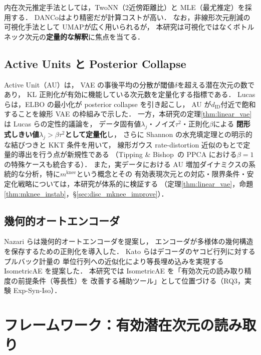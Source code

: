 \documentclass[11pt,a4paper]{jsarticle}
\newcommand{\mknee}{m^{\mathrm{knee}}}
\begin{document}
内在次元推定手法としては，TwoNN\cite{facco2017twonn}（2近傍距離比）と
MLE\cite{levina2005mle}（最尤推定）を採用する．
DANCo\cite{ceruti2014danco}はより精密だが計算コストが高い．
なお，非線形次元削減の可視化手法として UMAP\cite{mcinnes2018umap}が広く用いられるが，
本研究は可視化ではなくボトルネック次元の\textbf{定量的な解釈}に焦点を当てる．

\subsection{Active Units と Posterior Collapse}\label{sec:related_au}

Active Unit（AU）\cite{lucas2019elbo,higgins2017betavae}は，
VAE の事後平均の分散が閾値$\delta$を超える潜在次元の数であり，
KL 正則化が有効に機能している次元数を定量化する指標である．
Lucas ら\cite{lucas2019elbo}は，ELBO の最小化が posterior collapse を引き起こし，
AU が$d_{\mathrm{ID}}$付近で飽和することを線形 VAE の枠組みで示した．
一方，本研究の定理\ref{thm:linear_vae}は Lucas らの定性的議論を，
データ固有値$\lambda_j$・ノイズ$\tau^2$・正則化$\beta$による
\textbf{閉形式しきい値$\lambda_j > \beta\tau^2$として定量化}し，
さらに Shannon の水充填定理との明示的な結びつきと KKT 条件を用いて，
線形ガウス rate-distortion 近似のもとで定量的導出を行う点が新規性である
（Tipping \& Bishop~\cite{tippingbishop1999ppca}の PPCA における$\beta=1$の特殊ケースも統合する）．
また，実データにおける AU 増加ダイナミクスの系統的な分析，特に$\mknee$という概念とその
有効表現次元との対応・限界条件・安定化戦略については，本研究が体系的に検証する
（定理\ref{thm:linear_vae}，命題\ref{thm:mknee_instab}，§\ref{sec:disc_mknee_improve}）．

\subsection{幾何的オートエンコーダ}\label{sec:related_geo}

Nazari ら\cite{nazari2023geometric}は幾何的オートエンコーダを提案し，
エンコーダが多様体の幾何構造を保存するための正則化を導入した．
Kato ら\cite{kato2020rdae}はデコーダのヤコビ行列に対するプルバック計量の
単位行列への近似化により等長埋め込みを実現する IsometricAE を提案した．
本研究では IsometricAE を「有効次元の読み取り精度の前提条件（等長性）を
改善する補助ツール」として位置づける（RQ3，実験 Exp-Syn-Iso）．

\section{フレームワーク：有効潜在次元の読み取り}\label{sec:framework}
\end{document}
